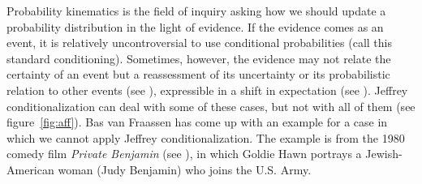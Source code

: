 Probability kinematics is the field of inquiry asking how we should
update a probability distribution in the light of evidence. If the
evidence comes as an event, it is relatively uncontroversial to use
conditional probabilities (call this standard conditioning).
Sometimes, however, the evidence may not relate the certainty of an
event but a reassessment of its uncertainty or its probabilistic
relation to other events (see ),
expressible in a shift in expectation (see ).
Jeffrey conditionalization can deal with some of these cases, but not
with all of them (see figure~\ref{fig:aff}). Bas van Fraassen has come
up with an example for a case in which we cannot apply Jeffrey
conditionalization. The example is from the 1980 comedy film
\emph{Private Benjamin} (see ), in
which Goldie Hawn portrays a Jewish-American woman (Judy Benjamin) who
joins the U.S. Army.

